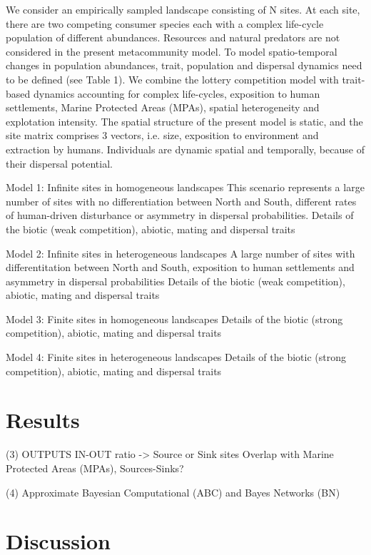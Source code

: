 \documentclass[12pt]{article}
\begin{document}
\begin{flushleft}
{{{{{We consider an empirically sampled landscape consisting of N sites. At each site, there are two competing consumer species each with a complex life-cycle population of different abundances. Resources and natural predators are not considered in the present metacommunity model. To model spatio-temporal changes in population abundances, trait, population and dispersal dynamics need to be defined (see Table 1). We combine the lottery competition model \citep{chesson1981environmental} with trait-based dynamics accounting for complex life-cycles, exposition to human settlements, Marine Protected Areas (MPAs), spatial heterogeneity and explotation intensity. The spatial structure of the present model is static, and the site matrix comprises 3 vectors, i.e. size, exposition to environment and extraction by humans. Individuals are dynamic spatial and temporally, because of their dispersal potential.

Model 1: Infinite sites in homogeneous landscapes
This scenario represents a large number of sites with no differentiation between North and South, different rates of human-driven disturbance or asymmetry in dispersal probabilities. Details of the biotic (weak competition), abiotic, mating and dispersal traits

Model 2: Infinite sites in heterogeneous landscapes 
A large number of sites with differentitation between North and South, exposition to human settlements and asymmetry in dispersal probabilities
Details of the biotic (weak competition), abiotic, mating and dispersal traits

Model 3: Finite sites in homogeneous landscapes 
Details of the biotic (strong competition), abiotic, mating and dispersal traits

Model 4: Finite sites in heterogeneous landscapes 
Details of the biotic (strong competition), abiotic, mating and dispersal traits

\section{Results}

(3) OUTPUTS
IN-OUT ratio -> Source or Sink sites
Overlap with Marine Protected Areas (MPAs), Sources-Sinks?

(4) Approximate Bayesian Computational (ABC) and Bayes Networks (BN)

\section{Discussion}

}}}}}
\end{flushleft}
\end{document}
